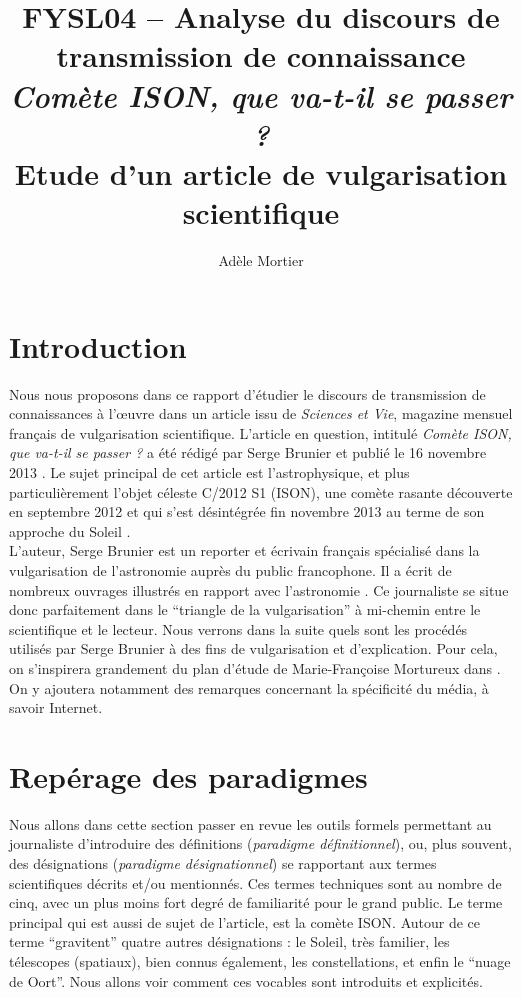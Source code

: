 \documentclass[a4paper,10pt]{article}
\title{FYSL04 -- Analyse du discours de transmission de connaissance\\
	\textit{Comète ISON, que va-t-il se passer ?}\\ \vspace{0.3cm}
	\small Etude d'un article de vulgarisation scientifique}
\author{Adèle Mortier}
\begin{document}
\maketitle
\nocite{*}
\tableofcontents

\section*{Introduction} \label{intro}
	Nous nous proposons dans ce rapport d'étudier le discours de transmission de connaissances à l'œuvre dans un article issu de \textit{Sciences et Vie}, magazine mensuel français de vulgarisation scientifique. L'article en question, intitulé \textit{Comète ISON, que va-t-il se passer ?} a été rédigé par Serge Brunier et publié le 16 novembre 2013 \cite{Brunier2013b}. Le sujet principal de cet article est l'astrophysique, et plus particulièrement l'objet céleste C/2012 S1 (ISON), une comète rasante découverte en septembre 2012 et qui s'est désintégrée fin novembre 2013 au terme de son approche du Soleil \cite{ISON}.\\
	L'auteur, Serge Brunier est un reporter et écrivain français spécialisé dans la vulgarisation de l'astronomie auprès du public francophone. Il a écrit de nombreux ouvrages illustrés en rapport avec l'astronomie \cite{SB}. Ce journaliste se situe donc parfaitement dans le ``triangle de la vulgarisation'' à mi-chemin entre le scientifique et le lecteur. Nous verrons dans la suite quels sont les procédés utilisés par Serge Brunier à des fins de vulgarisation et d'explication. Pour cela, on s'inspirera grandement du plan d'étude de Marie-Françoise Mortureux dans \cite{Mortureux1993}. On y ajoutera notamment des remarques concernant la spécificité du média, à savoir Internet.

\section{Repérage des paradigmes} \label{reperage}
	Nous allons dans cette section passer en revue les outils formels permettant au journaliste d'introduire des définitions (\textit{paradigme définitionnel}), ou, plus souvent, des désignations (\textit{paradigme désignationnel}) se rapportant aux termes scientifiques décrits et/ou mentionnés. Ces termes techniques sont au nombre de cinq, avec un plus moins fort degré de familiarité pour le grand public. Le terme principal qui est aussi de sujet de l'article, est la comète ISON. Autour de ce terme ``gravitent'' quatre autres désignations : le Soleil, très familier, les télescopes (spatiaux), bien connus également, les constellations, et enfin le ``nuage de Oort''. Nous allons voir comment ces vocables sont introduits et explicités. 
\end{document}

